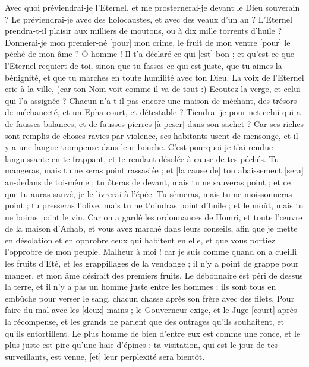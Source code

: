 \begin{multicols}{2}
Avec quoi préviendrai-je l'Eternel, et me prosternerai-je devant le Dieu souverain ? Le préviendrai-je avec des holocaustes, et avec des veaux d'un an ?
L'Eternel prendra-t-il plaisir aux milliers de moutons, ou à dix mille torrents d'huile ? Donnerai-je mon premier-né [pour] mon crime, le fruit de mon ventre [pour] le péché de mon âme ?
Ô homme ! Il t'a déclaré ce qui [est] bon ; et qu'est-ce que l'Eternel requiert de toi, sinon que tu fasses ce qui est juste, que tu aimes la bénignité, et que tu marches en toute humilité avec ton Dieu.
La voix de l'Eternel crie à la ville, (car ton Nom voit comme il va de tout :) Ecoutez la verge, et celui qui l'a assignée ?
Chacun n'a-t-il pas encore une maison de méchant, des trésors de méchanceté, et un Epha court, et détestable ?
Tiendrai-je pour net celui qui a de fausses balances, et de fausses pierres [à peser] dans son sachet ?
Car ses riches sont remplis de choses ravies par violence, ses habitants usent de mensonge, et il y a une langue trompeuse dans leur bouche.
C'est pourquoi je t'ai rendue languissante en te frappant, et te rendant désolée à cause de tes péchés.
Tu mangeras, mais tu ne seras point rassasiée ; et [la cause de] ton abaissement [sera] au-dedans de toi-même ; tu ôteras de devant, mais tu ne sauveras point ; et ce que tu auras sauvé, je le livrerai à l'épée.
Tu sèmeras, mais tu ne moissonneras point ; tu presseras l'olive, mais tu ne t'oindras point d'huile ; et le moût, mais tu ne boiras point le vin.
Car on a gardé les ordonnances de Homri, et toute l'œuvre de la maison d'Achab, et vous avez marché dans leurs conseils, afin que je mette en désolation et en opprobre ceux qui habitent en elle, et que vous portiez l'opprobre de mon peuple.
\VerseOne{}Malheur à moi ! car je suis comme quand on a cueilli les fruits d'Eté, et les grappillages de la vendange ; il n'y a point de grappe pour manger, et mon âme désirait des premiers fruits.
Le débonnaire est péri de dessus la terre, et il n'y a pas un homme juste entre les hommes ; ils sont tous en embûche pour verser le sang, chacun chasse après son frère avec des filets.
Pour faire du mal avec les [deux] mains ; le Gouverneur exige, et le Juge [court] après la récompense, et les grands ne parlent que des outrages qu'ils souhaitent, et qu'ils entortillent.
Le plus homme de bien d'entre eux est comme une ronce, et le plus juste est pire qu'une haie d'épines : ta visitation, qui est le jour de tes surveillants, est venue, [et] leur perplexité sera bientôt.

\end{multicols}
